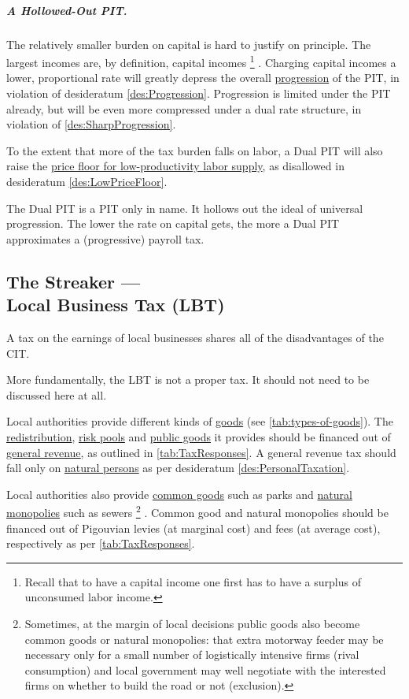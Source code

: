 \subparagraph{A Hollowed-Out PIT.} The relatively smaller burden on capital is hard to justify on principle.
The largest incomes are, by definition, capital incomes
\footnote{
	Recall that to have a capital income one first has to have a surplus of unconsumed labor income.
}
.
Charging capital incomes a lower, proportional rate will greatly depress the overall \hyperref[des:Progression]{progression} of the PIT, in violation of desideratum \ref{des:Progression}.
Progression is limited under the PIT already, but will be even more compressed under a dual rate structure, in violation of \ref{des:SharpProgression}.

To the extent that more of the tax burden falls on labor, a Dual PIT will also raise the \hyperref[des:LowPriceFloor]{price floor for low-productivity labor supply}, as disallowed in desideratum \ref{des:LowPriceFloor}.

The Dual PIT is a PIT only in name.
It hollows out the ideal of universal progression.
The lower the rate on capital gets, the more a Dual PIT approximates a (progressive) payroll tax.

\subsection[Business Tax]{The Streaker ---\\Local Business Tax (LBT)} \label{sec:ScoreLBT} A tax on the earnings of local businesses shares all of the disadvantages of the CIT.

More fundamentally, the LBT is not a proper tax.
It should not need to be discussed here at all.

Local authorities provide different kinds of \hyperref[tab:types-of-goods]{goods} (see \autoref{tab:types-of-goods}).
The \hyperref[sec:Redistribution]{redistribution}, \hyperref[sec:RiskPooling]{risk pools} and \hyperref[sec:PublicGood]{public goods} it provides should be financed out of \hyperref[tab:TaxResponses]{general revenue}, as outlined in \autoref{tab:TaxResponses}.
A general revenue tax should fall only on \hyperref[des:PersonalTaxation]{natural persons} as per desideratum \ref{des:PersonalTaxation}.

Local authorities also provide \hyperref[sec:CommonGood]{common goods} such as parks and \hyperref[sec:NaturalMonopolies]{natural monopolies} such as sewers
\footnote{
	Sometimes, at the margin of local decisions public goods also become common goods or natural monopolies:
	that extra motorway feeder may be necessary only for a small number of logistically intensive firms (rival consumption) and local government may well negotiate with the interested firms on whether to build the road or not (exclusion).
}
.
Common good and natural monopolies should be financed out of Pigouvian levies (at marginal cost) and fees (at average cost), respectively as per \autoref{tab:TaxResponses}.

